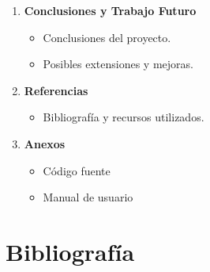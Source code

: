 \documentclass[12pt]{article}
\begin{document}
\begin{enumerate}
\item \textbf{Conclusiones y Trabajo Futuro}

  \begin{itemize}
  \item Conclusiones del proyecto.
  \item Posibles extensiones y mejoras.
  \end{itemize}
\item \textbf{Referencias}

  \begin{itemize}
  \item Bibliografía y recursos utilizados.
  \end{itemize}

\item \textbf{Anexos}

  \begin{itemize}
  \item Código fuente
  \item Manual de usuario
  \end{itemize}
\end{enumerate}

\section*{Bibliografía}
\end{document}
